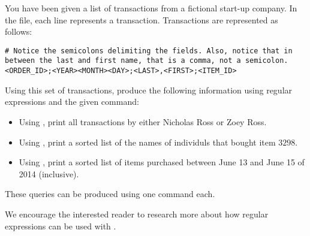 \begin{problem}
You have been given a list of transactions from a fictional start-up company. In the  file, each line represents a transaction. Transactions are represented as follows:
\begin{lstlisting}
# Notice the semicolons delimiting the fields. Also, notice that in between the last and first name, that is a comma, not a semicolon.
<ORDER_ID>;<YEAR><MONTH><DAY>;<LAST>,<FIRST>;<ITEM_ID> 
\end{lstlisting}

Using this set of transactions, produce the following information using regular expressions and the given command: 
\begin{itemize}
    \item Using , print all transactions by either Nicholas Ross or Zoey Ross.
    \item Using , print a sorted list of the names of individuls that bought item $3298$.
    \item Using , print a sorted list of items purchased between June 13 and June 15 of 2014 (inclusive).
\end{itemize}
These queries can be produced using one command each.
\end{problem}

We encourage the interested reader to research more about how regular expressions can be used with .
